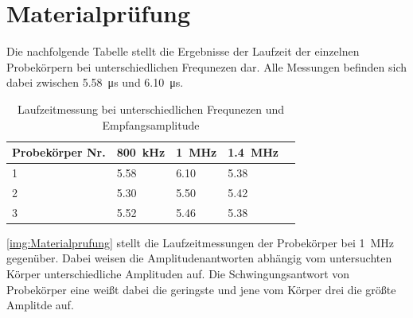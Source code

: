 \section{Materialprüfung}

Die nachfolgende Tabelle stellt die Ergebnisse der Laufzeit der einzelnen Probekörpern bei unterschiedlichen Frequnezen dar. Alle Messungen befinden sich dabei  zwischen  \SI{5.58}{\micro s} und  \SI{6.10}{\micro s}.


\begin{table}[H]
    \centering
    \begin{tabular}{l|llll}
         Probekörper Nr. &  \SI{800}{kHz} & \SI{1}{MHz} & \SI{1.4}{MHz} &  \\
         \hline
         1 & 5.58  & 6.10 & 5.38 &   \\
         2 & 5.30  & 5.50 & 5.42 &  \\
         3 & 5.52  & 5.46 & 5.38 &  
    \end{tabular}
    \caption{Laufzeitmessung bei unterschiedlichen Frequnezen und Empfangsamplitude}
    \label{tab:Materialprüfung}
\end{table}


\autoref{img:Materialprufung} stellt die Laufzeitmessungen der Probekörper bei \SI{1}{MHz} gegenüber. Dabei weisen die Amplitudenantworten abhängig vom untersuchten Körper unterschiedliche Amplituden auf. Die Schwingungsantwort von Probekörper eine weißt dabei die geringste und jene vom Körper drei die größte Amplitde auf.


